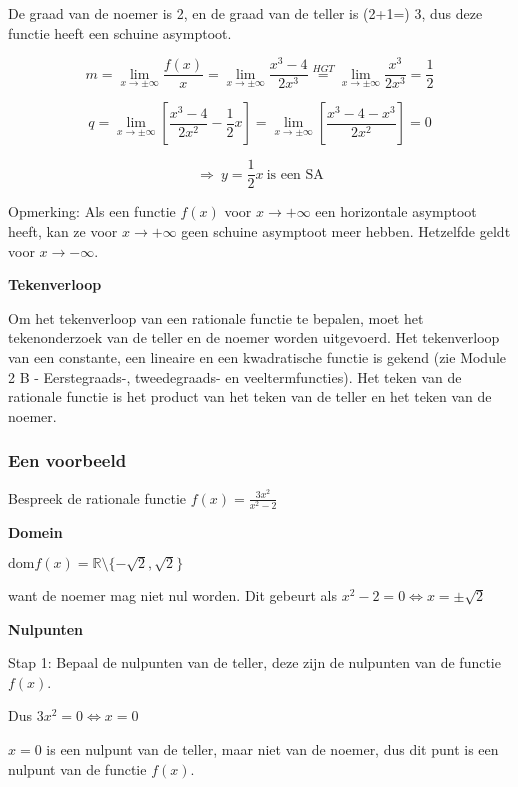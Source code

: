 De graad van de noemer is 2, en de graad van de teller is (2+1=) 3,
dus deze functie heeft een schuine asymptoot.

\[
{\displaystyle m={\displaystyle \lim_{x\to\pm\infty}}\frac{f(x)}{x}={\displaystyle \lim_{x\to\pm\infty}}\frac{x^{3}-4}{2x^{3}}\overset{HGT}{=}{\displaystyle \lim_{x\to\pm\infty}}\frac{x^{3}}{2x^{3}}=\frac{1}{2}}
\]


\[
{\displaystyle q={\displaystyle \lim_{x\to\pm\infty}}\left[\frac{x^{3}-4}{2x^{2}}-\frac{1}{2}x\right]={\displaystyle \lim_{x\to\pm\infty}}\left[\frac{x^{3}-4-x^{3}}{2x^{2}}\right]=0}
\]


\[
{\displaystyle \Rightarrow\:y=\frac{1}{2}x\:\textrm{is een SA}}
\]


Opmerking: Als een functie $f(x)$ voor $x\rightarrow+\infty$ een
horizontale asymptoot heeft, kan ze voor $x\rightarrow+\infty$ geen
schuine asymptoot meer hebben. Hetzelfde geldt voor $x\rightarrow-\infty$.

\medskip{}


\noindent \textbf{Tekenverloop}

Om het tekenverloop van een rationale functie te bepalen, moet het
tekenonderzoek van de teller en de noemer worden uitgevoerd. Het tekenverloop
van een constante, een lineaire en een kwadratische functie is gekend
(zie Module 2 B - Eerstegraads-, tweedegraads- en veeltermfuncties).
Het teken van de rationale functie is het product van het teken van
de teller en het teken van de noemer.


\subsubsection{Een voorbeeld}

Bespreek de rationale functie ${\displaystyle f(x)=\frac{3x^{2}}{x^{2}-2}}$

\textbf{Domein}

$\textrm{dom}f(x)=\mathbb{R}\setminus\{-\sqrt{2},\sqrt{2}\}$

want de noemer mag niet nul worden. Dit gebeurt als ${\displaystyle x^{2}-2=0}\Longleftrightarrow x=\pm\sqrt{2}$ 

\medskip{}


\textbf{Nulpunten}

Stap 1: Bepaal de nulpunten van de teller, deze zijn de nulpunten
van de functie $f(x)$.

Dus ${\displaystyle 3x^{2}=0}\Longleftrightarrow x=0$ 

$x=0$ is een nulpunt van de teller, maar niet van de noemer, dus
dit punt is een nulpunt van de functie $f(x)$.\medskip{}


